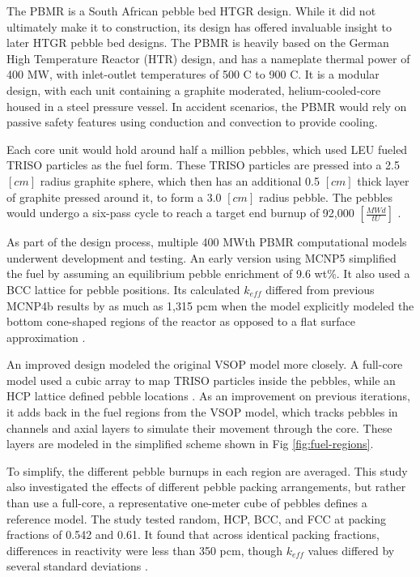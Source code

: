 The PBMR is a South African pebble bed HTGR design.  While it did not ultimately make it to construction, its design has offered invaluable insight to later HTGR pebble bed designs.  The PBMR is heavily based on the German High Temperature Reactor (HTR) design, and has a nameplate thermal power of 400 MW, with inlet-outlet temperatures of 500 \textdegree C to 900 \textdegree C.  It is a modular design, with each unit containing a graphite moderated, helium-cooled-core housed in a steel pressure vessel.  In accident scenarios, the PBMR would rely on passive safety features using conduction and convection to provide cooling.

Each core unit would hold around half a million pebbles, which used LEU fueled TRISO particles as the fuel form.  These TRISO particles are pressed into a 2.5 $\left[cm\right]$ radius graphite sphere, which then has an additional 0.5 $\left[cm\right]$ thick layer of graphite pressed around it, to form a 3.0 $\left[cm\right]$ radius pebble.  The pebbles would undergo a six-pass cycle to reach a target end burnup of 92,000 $\left[\frac{MWd}{tU}\right]$ \cite{venter_pbmr_2005}.

As part of the design process, multiple 400 MWth PBMR computational models underwent development and testing.  An early version using MCNP5 simplified the fuel by assuming an equilibrium pebble enrichment of 9.6 wt\%.  It also used a BCC lattice for pebble positions.  Its calculated $k_{eff}$ differed from previous MCNP4b results by as much as 1,315 pcm when the model explicitly modeled the bottom cone-shaped regions of the reactor as opposed to a flat surface approximation \cite{kim_monte_nodate}.

An improved design modeled the original VSOP model more closely.  A full-core model used a cubic array to map TRISO particles inside the pebbles, while an HCP lattice defined pebble locations \cite{albornoz_mcnp_nodate}.  As an improvement on previous iterations, it adds back in the fuel regions from the VSOP model, which tracks pebbles in channels and axial layers to simulate their movement through the core.  These layers are modeled in the simplified scheme shown in Fig \ref{fig:fuel-regions}.



To simplify, the different pebble burnups in each region are averaged.  This study also investigated the effects of different pebble packing arrangements, but rather than use a full-core, a representative one-meter cube of pebbles defines a reference model.  The study tested random, HCP, BCC, and FCC at packing fractions of 0.542 and 0.61.  It found that across identical packing fractions, differences in reactivity were less than 350 pcm, though $k_{eff}$ values differed by several standard deviations \cite{albornoz_mcnp_nodate}.

